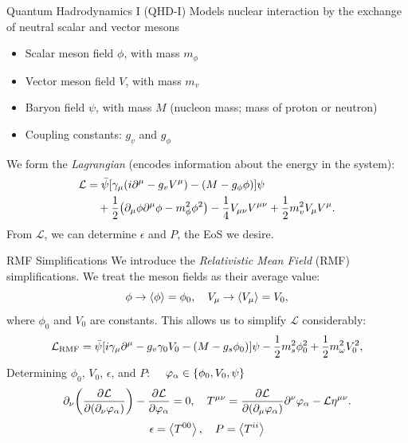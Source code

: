 \documentclass[]{beamer}
\newcommand{\Letter}[1]{\mathcal{#1}}
\newcommand{\Lag}{\Letter{L}}
\newcommand{\p}{\partial}
\begin{document}
    \begin{frame}{Quantum Hadrodynamics I (QHD-I)}
        Models nuclear interaction by the exchange of neutral scalar and vector mesons \pause \begin{itemize}
            \item Scalar meson field $\phi$, with mass $m_\phi$ \pause
            \item Vector meson field $V$, with mass $m_v$ \pause
            \item Baryon field $\psi$, with mass $M$ (nucleon mass; mass of proton or neutron) \pause
            \item Coupling constants: $g_v$ and $g_\phi$ \pause
        \end{itemize}
        We form the \textit{Lagrangian} (encodes information about the energy in the system): \pause
        \begin{align*}
            \Lag & = \bar{\psi} \bqty{\gamma_\mu(i\p^\mu -g_v V^\mu) - (M-g_\phi\phi)} \psi \nonumber\\
            & \quad + \frac{1}{2} \pqty{\p_\mu \phi \p^\mu \phi - m_\phi^2 \phi^2} - \frac{1}{4} V_{\mu\nu}V^{\mu\nu} + \frac{1}{2} m_v^2 V_\mu V^\mu.
        \end{align*}\pause
        From $\Lag$, we can determine $\epsilon$ and $P$, the EoS we desire.
    \end{frame}

    \begin{frame}{RMF Simplifications}
        We introduce the \textit{Relativistic Mean Field} (RMF) simplifications. \pause We treat the meson fields as their average value: \pause
        \[\phi \to \expval{\phi} = \phi_0, \quad V_\mu \to \expval{V_\mu} = V_0,\]
        where $\phi_0$ and $V_0$ are constants. \pause This allows us to simplify $\Lag$ considerably: \pause
        \begin{align*}
            \Lag_\text{RMF} = \bar\psi \bqty{i\gamma_\mu\p^\mu - g_v \gamma_0 V_0 - (M-g_s\phi_0)} \psi - \frac{1}{2} m_s^2 \phi_0^2 + \frac{1}{2} m_\omega^2 V_0^2,
        \end{align*} \pause
        Determining $\phi_0$, $V_0$, $\epsilon$, and $P$: \pause $\quad\varphi_\alpha \in \Bqty{\phi_0, V_0, \psi}$
        \[\p_\nu\qty(\pdv{\Lag}{(\p_\nu \varphi_\alpha)}) - \pdv{\Lag}{\varphi_\alpha} = 0, \quad
        T^{\mu\nu} = \pdv{\Lag}{(\p_\mu \varphi_\alpha)}\p^\nu \varphi_\alpha - \Lag \eta^{\mu\nu}.\] \pause
        $$\epsilon = \expval{T^{00}}, \quad P = \expval{T^{ii}}$$
    \end{frame}
\end{document}
